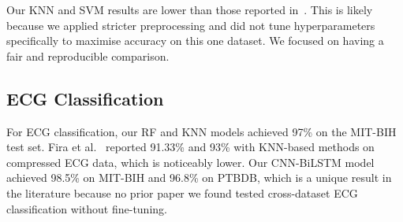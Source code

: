 \documentclass[10pt, twocolumn]{article}
\begin{document}
\begin{table}[H]
\centering
\caption{Comparison with Similar Studies -- Heart Disease Prediction.}
\label{tab:prior_hdp}
\end{table}

Our KNN and SVM results are lower than those reported in~\cite{agrahary2020}. This is likely
because we applied stricter preprocessing and did not tune hyperparameters specifically to
maximise accuracy on this one dataset. We focused on having a fair and reproducible comparison.

\subsection{ECG Classification}

For ECG classification, our RF and KNN models achieved 97\% on the MIT-BIH test set.
Fira et al.~\cite{fira2012} reported 91.33\% and 93\% with KNN-based methods on compressed
ECG data, which is noticeably lower. Our CNN-BiLSTM model achieved 98.5\% on MIT-BIH and
96.8\% on PTBDB, which is a unique result in the literature because no prior paper we found
tested cross-dataset ECG classification without fine-tuning.
\end{document}
